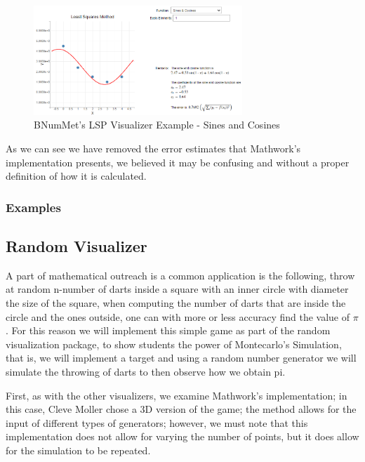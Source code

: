 \begin{figure}[H]
    \centering
    \includegraphics[width=0.7\textwidth]{Include/Images/Thesis/Development/Visualizers/LSP/BNumMet.LSP.Ex1.3.png}
    \caption{BNumMet's LSP Visualizer Example - Sines and Cosines}
    \label{fig:BNumMet's Least Squares Visualizer Example- Sines and Cosines}
\end{figure}
As we can see we have removed the error estimates that Mathwork's implementation presents, we believed it may be confusing and without a proper definition of how it is calculated.
\subsubsection{Examples}
	

\subsection{Random Visualizer}
A part of mathematical outreach is a common application is the following, throw at random n-number of darts inside a square with an inner circle with diameter the size of the square, when computing the number of darts that are inside the circle and the ones outside, one can with more or less accuracy find the value of $\pi$. For this reason we will implement this simple game as part of the random visualization package, to show students the power of Montecarlo's Simulation, that is, we will implement a target and using a random number generator we will simulate the throwing of darts to then observe how we obtain pi.

First, as with the other visualizers, we examine Mathwork's implementation; in this case, Cleve Moller chose a 3D version of the game; the method allows for the input of different types of generators; however, we must note that this implementation does not allow for varying the number of points, but it does allow for the simulation to be repeated.

